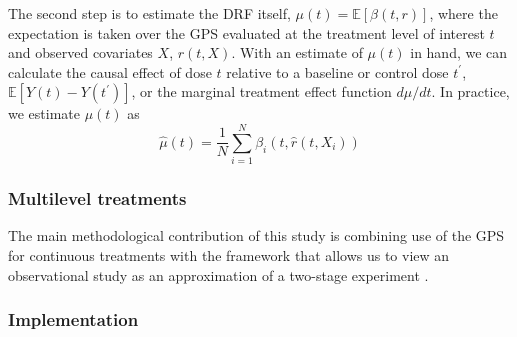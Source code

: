 \documentclass[11pt,a4paper]{article}
\newcommand\independent{\protect\mathpalette{\protect\independenT}{\perp}}
\def\independenT#1#2{\mathrel{\rlap{$#1#2$}\mkern2mu{#1#2}}}
\begin{document}
The second step is to estimate the DRF itself, $\mu(t) = \mathbb{E}[\beta(t,r)]$, where the expectation is taken over the GPS evaluated at the treatment level of interest $t$ and observed covariates $X$, $r(t, X)$. With an estimate of $\mu(t)$ in hand, we can calculate the causal effect of dose $t$ relative to a baseline or control dose $t^{\prime}$, $\mathbb{E}[Y(t)-Y(t^{\prime})]$, or the marginal treatment effect function $d\mu / dt$. In practice, we estimate $\mu(t)$ as
\[
	\widehat{\mu}(t) = \frac{1}{N} \sum_{i=1}^N \beta_i(t, \widehat{r}(t, X_i))
\]

\subsubsection{Multilevel treatments}
The main methodological contribution of this study is combining use of the GPS for continuous treatments \citep{hirano_imbens} with the framework that allows us to view an observational study as an approximation of a two-stage experiment \citep{hong_raudenbush}. 



\subsubsection{Implementation}
%
%
\end{document}

